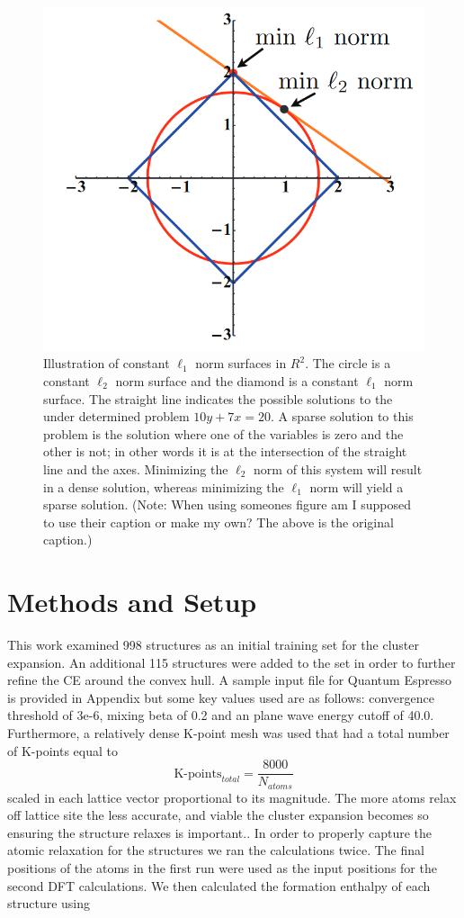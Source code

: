 \documentclass{article}
\begin{document}
\begin{figure}
    \centering
    \includegraphics[scale=0.5]{lnorm}
    \caption{Illustration of constant $\ell_1$ norm surfaces in $R^2$. The circle is a constant $\ell_2$ norm surface and the diamond is a constant $\ell_1$ norm surface. The straight line indicates the possible solutions to the under determined problem $10y + 7x = 20$. A sparse solution to this problem is the solution where one of the variables is zero and the other is not; in other words it is at the intersection of the straight line and the axes. Minimizing the $\ell_2$ norm of this system will result in a dense solution, whereas minimizing the $\ell_1$ norm will yield a sparse solution\cite{PhysRevB.88.155105}. (Note: When using someones figure am I supposed to use their caption or make my own? The above is the original caption.)}
    \label{fig:l1norm}
\end{figure}

\section{Methods and Setup}
This work examined 998 structures as an initial training set for the cluster expansion. An additional 115 structures were added to the set in order to further refine the CE around the convex hull. A sample input file for Quantum Espresso is provided in Appendix but some key values used are as follows: convergence threshold of 3e-6, mixing beta of 0.2 and an plane wave energy cutoff of 40.0. Furthermore, a relatively dense K-point mesh was used that had a total number of K-points equal to
$$ \text{K-points}_{total} = \frac{8000}{N_{atoms}} $$
scaled in each lattice vector proportional to its magnitude. The more atoms relax off lattice site the less accurate, and viable the cluster expansion becomes so ensuring the structure relaxes is important.\cite{2017arXiv170103080N}. In order to properly capture the atomic relaxation for the structures we ran the calculations twice. The final positions of the atoms in the first run were used as the input positions for the second DFT calculations. We then calculated the formation enthalpy of each structure using
\end{document}
